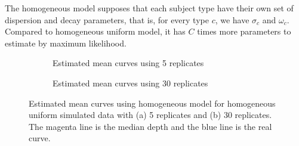 

\begin{knitrout}
\color{fgcolor}\begin{kframe}


{\ttfamily\noindent\bfseries{}}

{\ttfamily\noindent\bfseries{}}\end{kframe}
\end{knitrout}

The homogeneous model supposes that each subject type have their own  set of dispersion and decay parameters, that is, for every type $c$, we have $\sigma_c$ and $\omega_c$. Compared to homogeneous uniform model, it has $C$ times more parameters to estimate by maximum likelihood.


\begin{figure}[!t]
  \centering
  \begin{subfigure}{\textwidth}
    \centering
\begin{knitrout}
\color{fgcolor}\begin{kframe}


{\ttfamily\noindent\bfseries\color{errorcolor}{\#\# Error in eval(expr, envir, enclos): object 'hu2homog5' not found}}\end{kframe}
\end{knitrout}
    \caption{Estimated mean curves using 5 replicates}
  \end{subfigure}
  \begin{subfigure}{\textwidth}
    \centering
\begin{knitrout}
\color{fgcolor}\begin{kframe}


{\ttfamily\noindent\bfseries\color{errorcolor}{\#\# Error in eval(expr, envir, enclos): object 'hu2homog30' not found}}\end{kframe}
\end{knitrout}
    \caption{Estimated mean curves using 30 replicates}
  \end{subfigure}
  \caption[Mean curve estimation using homogeneous model for homogeneous uniform simulated data]{Estimated mean curves using homogeneous model for homogeneous uniform simulated data with (a) 5 replicates and (b) 30 replicates. The magenta line is the median depth and the blue line is the real curve.}
  \label{fig:mpchu2homog}
\end{figure}




